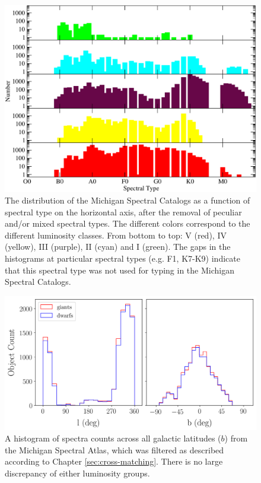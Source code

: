 \begin{figure}[t] 
    \centering
    \includegraphics[width=1.0\textwidth]{Figures/populations/hist-spt-count.pdf}
\caption{The distribution of the Michigan Spectral Catalogs as a function of spectral type on the horizontal axis, after the removal of peculiar and/or mixed spectral types.  The different colors correspond to the different luminosity classes.  From bottom to top: V (red), IV (yellow), III (purple), II (cyan) and I (green).  The gaps in the histograms at particular spectral types (e.g. F1, K7-K9) indicate that this spectral type was not used for typing in the Michigan Spectral Catalogs.} \label{fig:spt_michigan_hist}
\end{figure}

\begin{figure}
    \centering
    \includegraphics[width=1.0\textwidth]{Figures/populations/hist-b-vs-count.png}
    \caption{A histogram of spectra counts across all galactic latitudes ($b$) from the Michigan Spectral Atlas, which was filtered as described according to Chapter \ref{sec:cross-matching}. There is no large discrepancy of either luminosity groups.}
    \label{fig:b-vs-count}
\end{figure}

